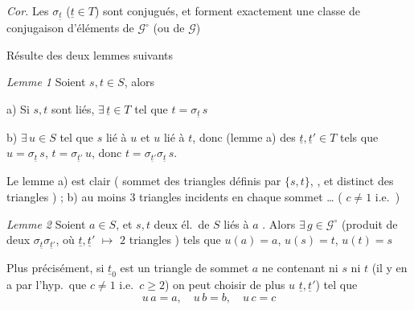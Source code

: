 \documentclass[11pt,a4paper]{article}
\begin{document}

\emph{Cor.} Les $\sigma_{\underline{t}}$ ($\underline{t}\in T$) sont conjugués, et
forment exactement une classe de conjugaison d'éléments de $\mathcal{G}^{\circ}$
(ou de $\mathcal{G}$)

Résulte des deux lemmes suivants

\emph{Lemme 1} Soient $s,t\in S$, alors

a) Si $s,t$ sont liés, $\exists\,\underline{t}\in T$ tel que
$t=\sigma_{\underline{t}}\,s$

b)  $\exists\,u\in S$ tel que $s$
lié à $u$ et $u$ lié à $t$, donc (lemme a) des $\underline{t},\underline{t}'\in T$
tels que $u=\sigma_{\underline{t}}\,s$, $t=\sigma_{\underline{t}'}\,u$, donc
$t=\sigma_{\underline{t}'}\sigma_{\underline{t}}\,s$.

Le lemme a) est clair (  \ill{}
sommet des triangles définis par $\{s,t\}$, , et \ill{} distinct des  triangles
) ; b) \ill{} \ill{} au moins $3$ triangles incidents en
chaque sommet … ( $c\neq1$ i.e.\ \ill{})

\emph{Lemme 2} Soient $a\in S$, \struck{\ill{}} et $s,t$ deux él.\ de $S$ liés à
$a$ \add{\ill{}}. Alors $\exists\,g\in\mathcal{G}^{\circ}$ (produit de deux
$\sigma_{\underline{t}}\sigma_{\underline{t}'}$, où $\underline{t},\underline{t}'$
$\mapsto$ $2$ triangles ) tels que $u(a)=a$,
$u(s)=t$, $u(t)=s$ 

Plus précisément, si $\underline{t}_0$  est un triangle de
sommet $a$ ne contenant ni $s$ ni $t$ (il y en a par l'hyp.\ que $c\neq1$ i.e.\
$c\geqslant2$) on peut choisir de plus $u$ 
$\underline{t},\underline{t}'$) tel que
\[
  u\,a=a,\quad u\,b=b,\quad u\,c=c
\]
\end{document}
